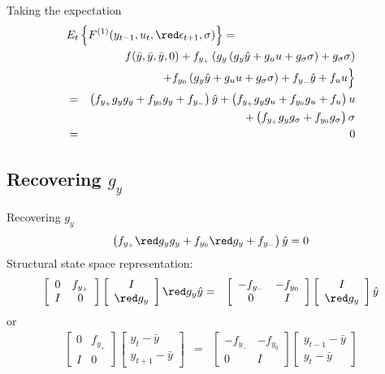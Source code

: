 \documentclass{beamer}
\begin{document}
\begin{slide}{Taking the expectation}
\begin{eqnarray*}
   \lefteqn{E_t\left\{F^{(1)}(y_{t-1},u_t,{\red \epsilon_{t+1}},\sigma)\right\} =}\\
&& f(\bar y, \bar y, \bar y, 0)+f_{y_+}\left(g_y\left(g_y\hat y+g_uu+g_\sigma\sigma\right)+g_\sigma\sigma\right)\\
&& + f_{y_0}\left(g_y\hat y+g_uu+g_\sigma\sigma\right)+f_{y_-}\hat y+f_u u\Big\}\\
&=& \left(f_{y_+}g_yg_y+f_{y_0}g_y+f_{y_-}\right)\hat y+\left(f_{y_+}g_yg_u+f_{y_0}g_u+f_{u}\right)u\\
&& +\left(f_{y_+}g_yg_\sigma+f_{y_0}g_\sigma\right)\sigma\\
&=& 0\\
\end{eqnarray*}
  
\end{slide}

\subsection[Recovering $g_y$]{Recovering $g_y$}
\begin{slide}{Recovering $g_y$}
\[
\left(f_{y_+}{\red g_yg_y}+f_{y_0}{\red g_y}+f_{y_-}\right)\hat y= 0
\]
Structural state space representation:
\begin{eqnarray*}
\left[\begin{array}{cc}
    0 & f_{y_+} \\ I & 0 
  \end{array}\right]
\left[\begin{array}{c}
    I \\ {\red g_y}
  \end{array}\right]{\red g_y} \hat y
&=&
\left[\begin{array}{cc}
    -f_{y_-} & -f_{y_0} \\ 0 & I 
  \end{array}\right]
\left[\begin{array}{c}
    I \\ {\red g_y}
  \end{array}\right]\hat y
\end{eqnarray*}
or
\begin{eqnarray*}
\left[\begin{array}{cc}
    0 & f_{y_+} \\ I & 0 
  \end{array}\right]
\left[\begin{array}{c}
    y_t-\bar y \\ y_{t+1}-\bar y
  \end{array}\right]
&=&
\left[\begin{array}{cc}
    -f_{y_-} & -f_{y_0} \\ 0 & I 
  \end{array}\right]
\left[\begin{array}{c}
    y_{t-1}-\bar y \\ y_t-\bar y
  \end{array}\right]
\end{eqnarray*}
\end{slide}
\end{document}
